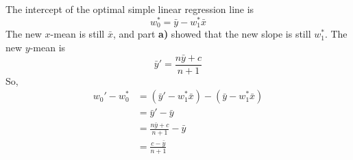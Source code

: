 \documentclass[11pt]{article}
\begin{document}
\begin{prob}
\begin{subprob}
    

\begin{solution}
The intercept of the optimal simple linear regression line is
\[
w_0^* = \bar{y}-w_1^*\bar{x}
\]
The new $x$-mean is still $\bar{x}$, and part \textbf{a)} showed that the new slope is still $w_1^*$. The new $y$-mean is
\[
\bar{y}'=\frac{n\bar{y}+c}{n+1}
\]
So,
\begin{align*}
w_0'-w_0^*
&=
(\bar{y}'-w_1^*\bar{x})-(\bar{y}-w_1^*\bar{x}) \\
&= \bar{y}'-\bar{y} \\
&= \frac{n\bar{y}+c}{n+1}-\bar{y} \\
&= \frac{c-\bar{y}}{n+1}
\end{align*}
\end{solution}
\end{subprob}

\end{prob}

\newpage
\end{document}
